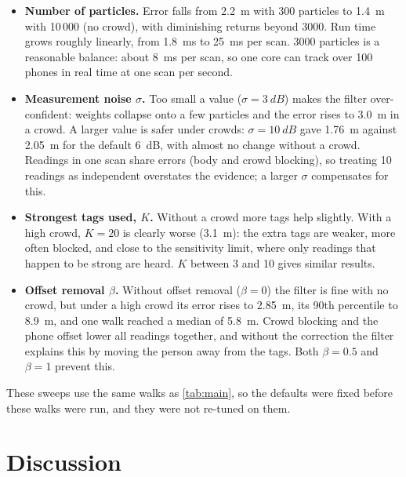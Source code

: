 \documentclass[11pt,a4paper]{article}
\begin{document}
\begin{itemize}
  \item \textbf{Number of particles.} Error falls from \SI{2.2}{m} with 300 particles to
        \SI{1.4}{m} with 10\,000 (no crowd), with diminishing returns beyond 3000. Run
        time grows roughly linearly, from \SI{1.8}{ms} to \SI{25}{ms} per scan. 3000
        particles is a reasonable balance: about \SI{8}{ms} per scan, so one core can
        track over 100 phones in real time at one scan per second.
  \item \textbf{Measurement noise $\sigma$.} Too small a value ($\sigma=\SI{3}{dB}$)
        makes the filter over-confident: weights collapse onto a few particles and the
        error rises to \SI{3.0}{m} in a crowd. A larger value is safer under crowds:
        $\sigma=\SI{10}{dB}$ gave \SI{1.76}{m} against \SI{2.05}{m} for the default
        \SI{6}{dB}, with almost no change without a crowd. Readings in one scan share
        errors (body and crowd blocking), so treating 10 readings as independent
        overstates the evidence; a larger $\sigma$ compensates for this.
  \item \textbf{Strongest tags used, $K$.} Without a crowd more tags help slightly. With a
        high crowd, $K=20$ is clearly worse (\SI{3.1}{m}): the extra tags are weaker, more
        often blocked, and close to the sensitivity limit, where only readings that
        happen to be strong are heard. $K$ between 3 and 10 gives similar results.
  \item \textbf{Offset removal $\beta$.} Without offset removal ($\beta=0$) the filter is
        fine with no crowd, but under a high crowd its error rises to \SI{2.85}{m}, its
        90th percentile to \SI{8.9}{m}, and one walk reached a median of \SI{5.8}{m}.
        Crowd blocking and the phone offset lower all readings together, and without
        the correction the filter explains this by moving the person away from the
        tags. Both $\beta=0.5$ and $\beta=1$ prevent this.
\end{itemize}
These sweeps use the same walks as \cref{tab:main}, so the defaults were fixed before these
walks were run, and they were not re-tuned on them.

\section{Discussion}
\label{sec:discussion}
\end{document}
